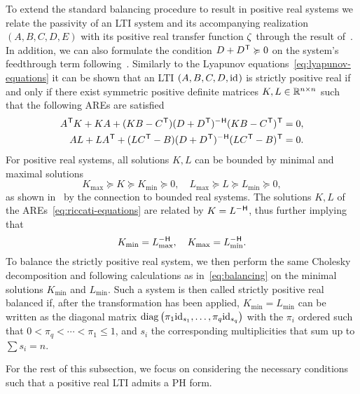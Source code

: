 To extend the standard balancing procedure to result in positive real systems we relate the passivity of an \ac{LTI} system and its accompanying realization $(A, B, C, D, E)$ with its positive real transfer function $\tfunc$ through the result of~\cite[Corollary~2.7]{CGH2022}.
In addition, we can also formulate the condition $D + D\trans \succcurlyeq 0$ on the system's feedthrough term following~\cite[Definition~5]{Gugercin2007}.
Similarly to the Lyapunov equations~\eqref{eq:lyapunov-equations} it can be shown that an \ac{LTI} $(A, B, C, D, \id)$ is strictly positive real if and only if there exist symmetric positive definite matrices $K, L \in \bb{R}^{n \times n}$ such that the following \acp{ARE} are satisfied
\begin{equation}\label{eq:riccati-equations}
    \begin{aligned}
        A\trans K + K A + (K B - C\trans) (D + D\trans)\inv (K B - C\trans)\trans &= 0, \\
        A L + L A\trans + (L C\trans - B) (D + D\trans)\inv (L C\trans - B)\trans &= 0.
    \end{aligned}
\end{equation}
For positive real systems, all solutions $K, L$ can be bounded by minimal and maximal solutions
\begin{equation*}
    K_{\max} \succcurlyeq K \succcurlyeq K_{\min} \succcurlyeq 0,\quad L_{\max} \succcurlyeq L \succcurlyeq L_{\min} \succcurlyeq 0,
\end{equation*}
as shown in~\cite[Proposition~5.1]{Ober1991} by the connection to bounded real systems.
The solutions $K, L$ of the \acp{ARE}~\eqref{eq:riccati-equations} are related by $K = L\inv$, thus further implying that
\begin{equation*}
    K_{\min} = L_{\max}\inv,\quad K_{\max} = L_{\min}\inv.
\end{equation*}
To balance the strictly positive real system, we then perform the same Cholesky decomposition and following calculations as in~\eqref{eq:balancing} on the minimal solutions $K_{\min}$ and $L_{\min}$.
Such a system is then called strictly positive real balanced if, after the transformation has been applied, $K_{\min} = L_{\min}$ can be written as the diagonal matrix $\diag{\pi_1 \id[s_1], \dots, \pi_q \id[s_q]}$ with the $\pi_i$ ordered such that $0 < \pi_q < \cdots < \pi_1 \leq 1$, and $s_i$ the corresponding multiplicities that sum up to $\sum s_i = n$.

For the rest of this subsection, we focus on considering the necessary conditions such that a positive real \ac{LTI} admits a \ac{PH} form.

